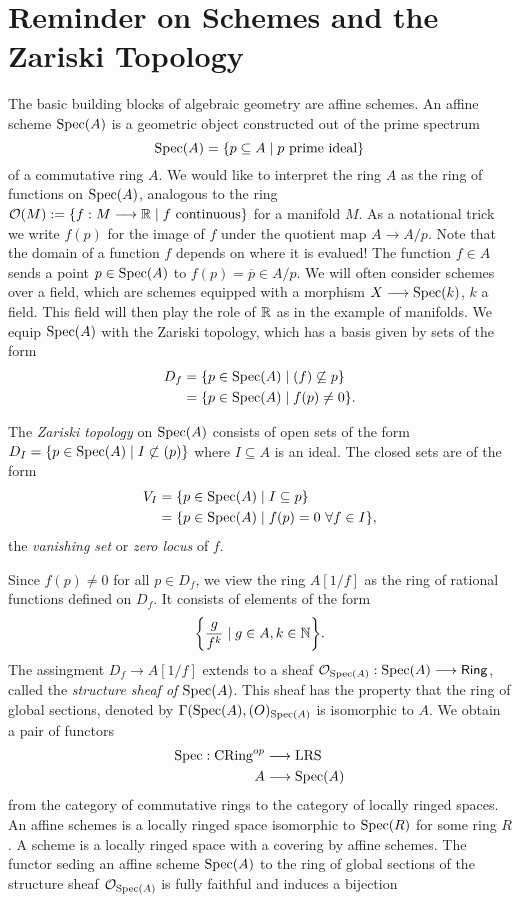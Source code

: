 \section{Reminder on Schemes and the Zariski Topology}
The basic building blocks of algebraic geometry are affine schemes. An affine scheme $\operatorname{Spec}(A)$ is a geometric object constructed out of the prime spectrum
\[
	\operatorname{Spec}(A) = \{p \subseteq A \mid p \text{ prime ideal}\}
\]
of a commutative ring $A$. We would like to interpret the ring $A$ as the ring of functions on $\operatorname{Spec}(A)$, analogous to the ring
$\mathcal{O}(M) := \{f: M \longrightarrow \mathbb{R} \mid f \text{ continuous}\}$
for a manifold $M$. As a notational trick we write $f(p)$ for the image of $f$ under the quotient map $A \to A/p$. Note that the domain of a function $f$ depends on where it is evalued! The function $f \in A$ sends a point $p \in \operatorname{Spec}(A)$ to $f(p) = \overline{p} \in A/p$.  We will often consider schemes over a field, which are schemes equipped with a morphism $X \longrightarrow \operatorname{Spec}(k)$, $k$ a field. This field will then play the role of $\mathbb{R}$ as in the example of manifolds. We equip $\operatorname{Spec}(A)$ with the Zariski topology, which has a basis given by sets of the form
\begin{align*}
	D_f & = \{ p \in \operatorname{Spec}(A) \mid (f) \not \subseteq p \} \\
	    & = \{ p \in \operatorname{Spec}(A) \mid f(p) \neq 0\}.
\end{align*}
\begin{definition}
	The \textit{Zariski topology} on $\operatorname{Spec}(A)$ consists of open sets of the form $D_I = \{ p \in \operatorname{Spec}(A) \mid I \not \subset (p)\}$ where $I \subseteq A$ is an ideal. The closed sets are of the form
	\begin{align*}
		V_I & = \{ p \in \operatorname{Spec}(A) \mid I \subseteq p \}              \\
		    & = \{ p \in \operatorname{Spec}(A) \mid f(p) = 0\ \forall f \in I \},
	\end{align*}
	the \textit{vanishing set} or \textit{zero locus} of $f$.
\end{definition}

Since $f(p) \neq 0$ for all $p \in D_f$, we view the ring $A[1/f]$ as the ring of rational functions defined on $D_f$. It consists of elements of the form
\[
	\biggl\{ \frac{g}{f^k} \mid g \in A, k \in \mathbb{N} \biggr\}.
\]
The assingment $D_f \to A[1/f]$ extends to a sheaf $\mathcal{O}_{\operatorname{Spec}(A)}: \operatorname{Spec}(A) \longrightarrow \mathsf{Ring}$, called the \textit{structure sheaf of $\operatorname{Spec}(A)$}. This sheaf has the property that the ring of global sections, denoted by $\Gamma(\operatorname{Spec}(A), \mathcal{(}O)_{\operatorname{Spec}(A)}$ is isomorphic to $A$. We obtain a pair of functors
\begin{align*}
	\operatorname{Spec} :  \text{CRing}^{op} & \longrightarrow \text{LRS} \\
	A                          & \longrightarrow \operatorname{Spec}(A)
\end{align*}
from the category of commutative rings to the category of locally ringed spaces. An affine schemes is a locally ringed space isomorphic to $\operatorname{Spec}(R)$ for some ring $R$. A scheme is a locally ringed space with a covering by affine schemes. The functor seding an affine scheme $\operatorname{Spec}(A)$ to the ring of global sections of the structure sheaf $\mathcal{O}_{\operatorname{Spec}(A)}$ is fully faithful and induces a bijection


